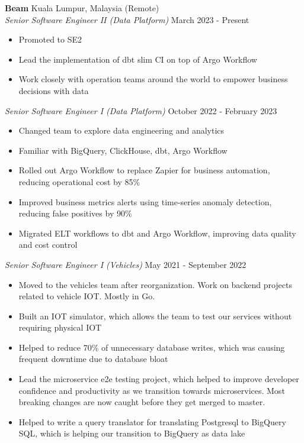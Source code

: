 \documentclass[a4paper]{article}
\begin{document}
\textbf{Beam} \hfill Kuala Lumpur, Malaysia (Remote)\\
\textit{Senior Software Engineer II (Data Platform)} \hfill March 2023 - Present\\
\vspace{-1mm}
\begin{itemize} \itemsep 1pt
	\item Promoted to SE2
	\item Lead the implementation of dbt slim CI on top of Argo Workflow
	\item Work closely with operation teams around the world to empower business decisions with data
\end{itemize}
\textit{Senior Software Engineer I (Data Platform)} \hfill October 2022 - February 2023\\
\vspace{-1mm}
\begin{itemize} \itemsep 1pt
	\item Changed team to explore data engineering and analytics
	\item Familiar with BigQuery, ClickHouse, dbt, Argo Workflow
	\item Rolled out Argo Workflow to replace Zapier for business automation, reducing operational cost by 85\%
	\item Improved business metrics alerts using time-series anomaly detection, reducing false positives by 90\%
	\item Migrated ELT workflows to dbt and Argo Workflow, improving data quality and cost control
\end{itemize}
\textit{Senior Software Engineer I (Vehicles)} \hfill May 2021 - September 2022\\
\vspace{-1mm}
\begin{itemize} \itemsep 1pt
	\item Moved to the vehicles team after reorganization. Work on backend projects related to vehicle IOT. Mostly in Go.
	\item Built an IOT simulator, which allows the team to test our services without requiring physical IOT
	\item Helped to reduce 70\% of unnecessary database writes, which was causing frequent downtime due to database bloat
	\item Lead the microservice e2e testing project, which helped to improve developer confidence and productivity as we transition towards microservices. Most breaking changes are now caught before they get merged to master.
	\item Helped to write a query translator for translating Postgresql to BigQuery SQL, which is helping our transition to BigQuery as data lake
\end{itemize}
\end{document}
